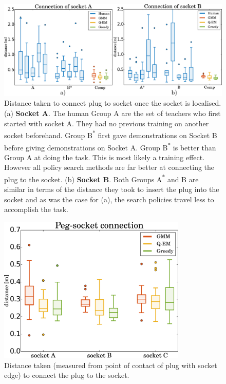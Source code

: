 \begin{figure}
 \centering
   \includegraphics[width=\textwidth]{./ch4-PiH/Figures/Results2/real_exp_socketAB.pdf}
  \caption{Distance taken to connect plug to socket once the socket is localised. (a) \textbf{Socket A}. The human 
  Group A are the set of teachers who first started with socket A. They had no previous training on another socket beforehand. Group 
  B\textsuperscript{*} first gave demonstrations on Socket B before giving demonstrations on Socket A. Group B\textsuperscript{*}
  is better than Group A at doing the task. This is most likely a training effect. However all policy search methods are far better
  at connecting the plug to the socket. (b) \textbf{Socket B}. Both Groups A\textsuperscript{*} and B are similar in terms 
  of the distance they took to insert the plug into the socket and as was the case for (a), the search policies travel less to accomplish 
  the task.   } 
  \label{fig:real_statistics}
\end{figure}

\begin{figure}
 \centering
   \includegraphics[width=0.8\textwidth]{./ch4-PiH/Figures/Results2/peg_socket_connection_v2.pdf}
   \caption{Distance taken (measured from point of contact of plug with socket edge) to connect the plug to the socket.}
  \label{fig:real_statistics2}
\end{figure}


